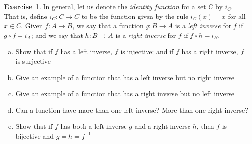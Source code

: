 \documentclass[11pt,a4paper,twoside]{article}
\theoremstyle{definition}
\newcounter{excounter}
\newtheorem{exercise}[excounter]{Exercise}
\begin{document}
\begin{exercise}
  In general, let us denote the \emph{identity function} for a set $C$ by $i_C$. That is,
  define $i_C : C \to C$ to be the function given by the rule $i_C (x) = x$ for all $x \in C$.
  Given $f : A \to B$, we say that a function $g : B \to A$ is a \emph{left inverse} for $f$ if $g \circ f = i_A$;
  and we say that $h : B \to A$ is a \emph{right inverse} for $f$ if $f \circ h = i_B$.
  \begin{enumerate}[(a)]
    \item Show that if $f$ has a left inverse, $f$ is injective; and if $f$ has a right inverse, $f$ is surjective
    \item Give an example of a function that has a left inverse but no right inverse
    \item Give an example of a function that has a right inverse but no left inverse
    \item Can a function have more than one left inverse? More than one right inverse?
    \item Show that if $f$ has both a left inverse $g$ and a right inverse $h$, then $f$ is bijective and $g = h = f^{-1}$
  \end{enumerate}

\end{exercise}
\end{document}
